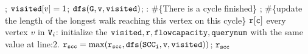 \begin{algorithm}
\begin{algorithmic}[1]
  \STATE \qquad \qquad \qquad {}; 
  \STATE \qquad \qquad \qquad  $\mathtt{visited}[v] = 1$; %
  \STATE \qquad \qquad \qquad $\mathtt{dfs(G, v, visited)}$;
  \STATE \qquad {}: \#\{There is a cycle finished\}
  \STATE \qquad \qquad \qquad 
  ; \#\{update the length of the longest walk reaching this vertex on this cycle\}
  \STATE {}  $\mathtt{r[c]}$
   every vertex $v$ in $\mathtt{V}_i$:
  \STATE  \qquad initialize the $\mathtt{visited, r, flowcapacity, querynum}$ with the same value at line:2.
  \STATE  \qquad $\mathtt{r_{scc} = \max(r_{scc}, dfs(SCC_i, v, \mathtt{visited} ))}$; 
  \RETURN  $\mathtt{r_{scc}}$
  \end{algorithmic}
  \end{algorithm}

